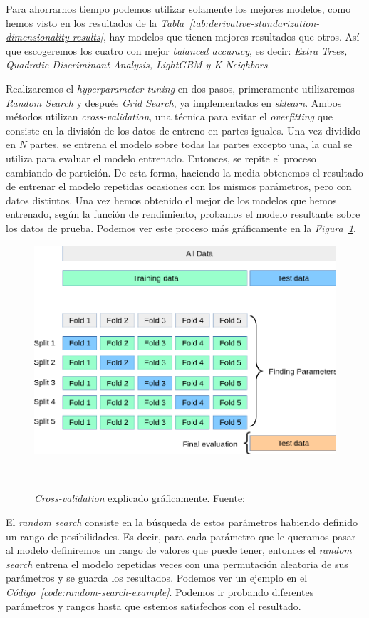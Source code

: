 Para ahorrarnos tiempo podemos utilizar solamente los mejores modelos, como hemos visto en los resultados de la \textit{Tabla\ \ref{tab:derivative-standarization-dimensionality-results}}, hay modelos que tienen mejores resultados que otros. Así que escogeremos los cuatro con mejor \textit{balanced accuracy}, es decir: \textit{Extra Trees, Quadratic Discriminant Analysis, LightGBM y K-Neighbors}.

Realizaremos el \textit{hyperparameter tuning} en dos pasos, primeramente utilizaremos \textit{Random Search} y después \textit{Grid Search}, ya implementados en \textit{sklearn}.
Ambos métodos utilizan \textit{cross-validation}, una técnica para evitar el \textit{overfitting} que consiste en la división de los datos de entreno en partes iguales.
Una vez dividido en \textit{N} partes, se entrena el modelo sobre todas las partes excepto una, la cual se utiliza para evaluar el modelo entrenado. Entonces, se repite el 
proceso cambiando de partición. De esta forma, haciendo la media obtenemos el resultado de entrenar el modelo repetidas ocasiones con los mismos parámetros, pero con datos 
distintos. Una vez hemos obtenido el mejor de los modelos que hemos entrenado, según la función de rendimiento, probamos el modelo resultante sobre los datos de prueba.
Podemos ver este proceso más gráficamente en la \textit{Figura\ \ref{fig:cross-validation}}.

\begin{figure}[!h]
    \centering
    \includegraphics[width=0.7\linewidth]{media/images/cross-validation.png}
    \caption{\textit{Cross-validation} explicado gráficamente. Fuente:\ \cite{31Crossv20:online}}\ \label{fig:cross-validation}
\end{figure}


El \textit{random search} consiste en la búsqueda de estos parámetros habiendo definido un rango de posibilidades. Es decir, para cada parámetro que le queramos
pasar al modelo definiremos un rango de valores que puede tener, entonces el \textit{random search} entrena el modelo repetidas veces con una permutación aleatoria de sus 
parámetros y se guarda los resultados. Podemos ver un ejemplo en el \textit{Código\ \ref{code:random-search-example}}.
Podemos ir probando diferentes parámetros y rangos hasta que estemos satisfechos con el resultado.


